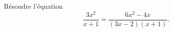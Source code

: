 
\begin{exercice}%
    \label{exosmath-0352}

Résoudre l'équation
\begin{equation}
    \frac{ 3x^2 }{ x+1 }=\frac{ 6x^2-4x }{ (3x-2)(x+1) }.
\end{equation}

\end{exercice}
